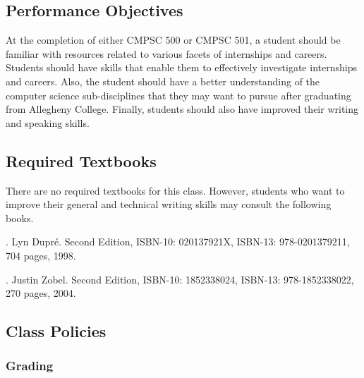 \subsection*{Performance Objectives}

At the completion of either CMPSC 500 or CMPSC 501, a student should be familiar with resources related to various facets of
internships and careers. Students should have skills that enable them to effectively investigate internships and
careers.  Also, the student should have a better understanding of the computer science sub-disciplines that they may
want to pursue after graduating from Allegheny College. Finally, students should also have improved their writing and
speaking skills.

\subsection*{Required Textbooks}

\noindent
There are no required textbooks for this class.  However, students who want to improve their general and technical writing skills
may consult the following books.

. Lyn Dupr\'e. Second Edition,  ISBN-10: 020137921X,
ISBN-13: 978-0201379211, 704 pages, 1998.

.  Justin Zobel. Second Edition,  ISBN-10: 1852338024, ISBN-13:
978-1852338022, 270 pages, 2004.

\subsection*{Class Policies}

\subsubsection*{Grading}

